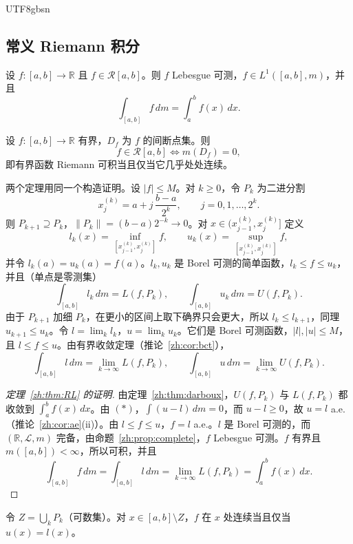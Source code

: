 \documentclass[11pt]{article}
\makeatletter
\newcommand{\envlabel}[1]{\protected@edef\@currentlabel{\themathenv}\label{#1}}
\makeatother
\begin{document}
\begin{CJK*}{UTF8}{gbsn}
\subsection{常义 Riemann 积分}

\begin{theorem}\envlabel{zh:thm:RL}
设 $f:[a,b]\to\mathbb{R}$ 且 $f\in\mathcal{R}[a,b]$。则 $f$ Lebesgue 可测，$f\in L^{1}([a,b],m)$，并且
\[
\int_{[a,b]}f\,dm=\int_{a}^{b}f(x)\,dx.
\]
\end{theorem}

\begin{theorem}[Lebesgue 判据]\envlabel{zh:thm:criterion}
设 $f:[a,b]\to\mathbb{R}$ 有界，$D_{f}$ 为 $f$ 的间断点集。则
\[
f\in\mathcal{R}[a,b]\iff m(D_{f})=0,
\]
即有界函数 Riemann 可积当且仅当它几乎处处连续。
\end{theorem}

两个定理用同一个构造证明。设 $|f|\leq M$。对 $k\geq0$，令 $P_{k}$ 为二进分割
\[
x_{j}^{(k)}=a+j\,\frac{b-a}{2^{k}},\qquad j=0,1,\ldots,2^{k}.
\]
则 $P_{k+1}\supseteq P_{k}$，$\|P_{k}\|=(b-a)2^{-k}\to0$。对 $x\in(x_{j-1}^{(k)},x_{j}^{(k)}]$ 定义
\[
l_{k}(x)=\inf_{[x_{j-1}^{(k)},x_{j}^{(k)}]}f,\qquad u_{k}(x)=\sup_{[x_{j-1}^{(k)},x_{j}^{(k)}]}f,
\]
并令 $l_{k}(a)=u_{k}(a)=f(a)$。$l_{k},u_{k}$ 是 Borel 可测的简单函数，$l_{k}\leq f\leq u_{k}$，并且（单点是零测集）
\[
\int_{[a,b]}l_{k}\,dm=L(f,P_{k}),\qquad\int_{[a,b]}u_{k}\,dm=U(f,P_{k}).
\]
由于 $P_{k+1}$ 加细 $P_{k}$，在更小的区间上取下确界只会更大，所以 $l_{k}\leq l_{k+1}$，同理 $u_{k+1}\leq u_{k}$。令 $l=\lim_{k}l_{k}$，$u=\lim_{k}u_{k}$。它们是 Borel 可测函数，$|l|,|u|\leq M$，且 $l\leq f\leq u$。由有界收敛定理（推论~\ref{zh:cor:bct}），
\[
\int_{[a,b]}l\,dm=\lim_{k\to\infty}L(f,P_{k}),\qquad\int_{[a,b]}u\,dm=\lim_{k\to\infty}U(f,P_{k}).\tag{$\ast$}
\]

\begin{proof}[定理~\ref{zh:thm:RL} 的证明]
由定理~\ref{zh:thm:darboux}，$U(f,P_{k})$ 与 $L(f,P_{k})$ 都收敛到 $\int_{a}^{b}f(x)\,dx$。由 $(\ast)$，$\int(u-l)\,dm=0$，而 $u-l\geq0$，故 $u=l$ a.e.（推论~\ref{zh:cor:ae}(ii)）。由 $l\leq f\leq u$，$f=l$ a.e.。$l$ 是 Borel 可测的，而 $(\mathbb{R},\mathcal{L},m)$ 完备，由命题~\ref{zh:prop:complete}，$f$ Lebesgue 可测。$f$ 有界且 $m([a,b])<\infty$，所以可积，并且
\[
\int_{[a,b]}f\,dm=\int_{[a,b]}l\,dm=\lim_{k\to\infty}L(f,P_{k})=\int_{a}^{b}f(x)\,dx.
\]
\end{proof}

\begin{lemma}\envlabel{zh:lem:cont}
令 $Z=\bigcup_{k}P_{k}$（可数集）。对 $x\in[a,b]\setminus Z$，$f$ 在 $x$ 处连续当且仅当 $u(x)=l(x)$。
\end{lemma}


\end{CJK*}
\end{document}

